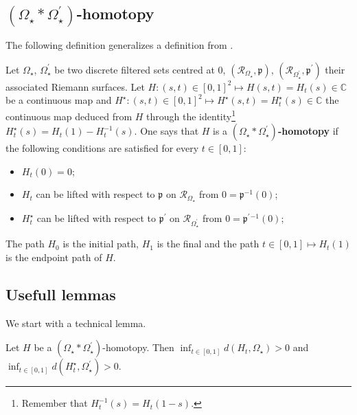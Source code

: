 \documentclass[11pt, english]{smfart}
\theoremstyle{definition}
\begin{document}
\subsection{$(\Omega_\star \ast \Omega_\star^\prime)$-homotopy}

The following definition generalizes a definition from \cite{S012,
  S014}.

\begin{defi}
Let $\Omega_\star$, $\Omega_\star^\prime$ be two discrete filtered
sets centred at $0$,
$(\mathscr{R}_{\Omega_\star}, \mathfrak{p})$,
$(\mathscr{R}_{\Omega_\star^\prime}, \mathfrak{p}^\prime)$ their
associated Riemann surfaces. Let  
${H : (s,t) \in [0,1]^2 \mapsto H(s,t)=H_t(s) \in
\mathbb{C}}$ be a continuous map and
$H^\star : (s,t) \in [0,1]^2 \mapsto H^\star(s,t)=H_t^\star(s)  \in
\mathbb{C}$ the continuous map deduced from $H$ through the
identity\footnote{Remember that $H_t^{-1}(s)=H_t(1-s)$.}
 $H_t^\star(s) = H_t(1)-H_t^{-1}(s)$. One says that $H$ is 
 a \textbf{$(\Omega_\star \ast \Omega_\star^\prime)$-homotopy} if the following
 conditions are satisfied for every $t \in [0,1]$:
\begin{itemize}
\item $H_t(0) = 0$;
\item $H_t$ can be lifted with respect to $\mathfrak{p}$ on 
$\mathscr{R}_{\Omega_\star}$ from $0 = \mathfrak{p}^{-1}(0)$;
\item $H_t^\star$ can be lifted with respect to $\mathfrak{p}^\prime$ on 
$\mathscr{R}_{\Omega_\star^\prime}$ from $0 = {\mathfrak{p}^\prime}{^{-1}}(0)$;
\end{itemize}
The path $H_0$ is the initial path, $H_1$ is the final and the path $t
\in [0,1] \mapsto H_t(1)$ is the endpoint path of 
$H$.
\end{defi}

\subsection{Usefull lemmas}

We start with a technical lemma.

\begin{lemm}\label{techlem}
Let $H$ be a $(\Omega_\star \ast \Omega_\star^\prime)$-homotopy. Then 
$\inf_{t \in [0,1]} d(H_t, \Omega_\star) >0$ and $\inf_{t \in [0,1]}
d(H_t^\star, \Omega_\star^\prime) >0$. 
\end{lemm}
\end{document}
